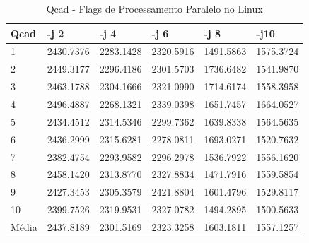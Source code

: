 \begin{table}[!ht]
\centering
\tiny
\caption{Qcad - Flags de Processamento Paralelo no Linux}
\label{tab:flag_processamento_paralelo:linux:qcad}
\begin{tabular}{llllll}
\textbf{Qcad} & \textbf{-j 2} & \textbf{-j 4} & \textbf{-j 6} & \textbf{-j 8} & \textbf{-j10}  \\ \toprule
1         & 2430.7376 &   2283.1428  &  2320.5916  &  1491.5863 &   1575.3724     \\ 
2         & 2449.3177 &   2296.4186  &  2301.5703  &  1736.6482 &   1541.9870     \\ 
3         & 2463.1788 &   2304.1666  &  2321.0990  &  1714.6174 &   1558.3958     \\ 
4         & 2496.4887 &   2268.1321  &  2339.0398  &  1651.7457 &   1664.0527     \\ 
5         & 2434.4512 &   2314.5346  &  2299.7362  &  1639.8338 &   1564.5635     \\ 
6         & 2436.2999 &   2315.6281  &  2278.0811  &  1693.0271 &   1520.7632     \\ 
7         & 2382.4754 &   2293.9582  &  2296.2978  &  1536.7922 &   1556.1620     \\ 
8         & 2458.1420 &   2313.8770  &  2327.8834  &  1471.7916 &   1559.5854     \\ 
9         & 2427.3453 &   2305.3579  &  2421.8804  &  1601.4796 &   1529.8117     \\ 
10        & 2399.7526 &   2319.9531  &  2327.0782  &  1494.2895 &   1500.5633     \\ \bottomrule
Média     & 2437.8189 &   2301.5169  &  2323.3258  &  1603.1811 &   1557.1257     \\ 
\end{tabular}
\end{table}


